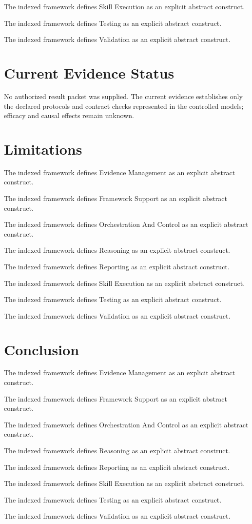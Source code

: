 \documentclass[11pt]{article}
\begin{document}
The indexed framework defines Skill Execution as an explicit abstract construct.

The indexed framework defines Testing as an explicit abstract construct.

The indexed framework defines Validation as an explicit abstract construct.

\section{Current Evidence Status}

No authorized result packet was supplied. The current evidence establishes only the declared protocols and contract checks represented in the controlled models; efficacy and causal effects remain unknown.

\section{Limitations}

The indexed framework defines Evidence Management as an explicit abstract construct.

The indexed framework defines Framework Support as an explicit abstract construct.

The indexed framework defines Orchestration And Control as an explicit abstract construct.

The indexed framework defines Reasoning as an explicit abstract construct.

The indexed framework defines Reporting as an explicit abstract construct.

The indexed framework defines Skill Execution as an explicit abstract construct.

The indexed framework defines Testing as an explicit abstract construct.

The indexed framework defines Validation as an explicit abstract construct.

\section{Conclusion}

The indexed framework defines Evidence Management as an explicit abstract construct.

The indexed framework defines Framework Support as an explicit abstract construct.

The indexed framework defines Orchestration And Control as an explicit abstract construct.

The indexed framework defines Reasoning as an explicit abstract construct.

The indexed framework defines Reporting as an explicit abstract construct.

The indexed framework defines Skill Execution as an explicit abstract construct.

The indexed framework defines Testing as an explicit abstract construct.

The indexed framework defines Validation as an explicit abstract construct.
\end{document}

